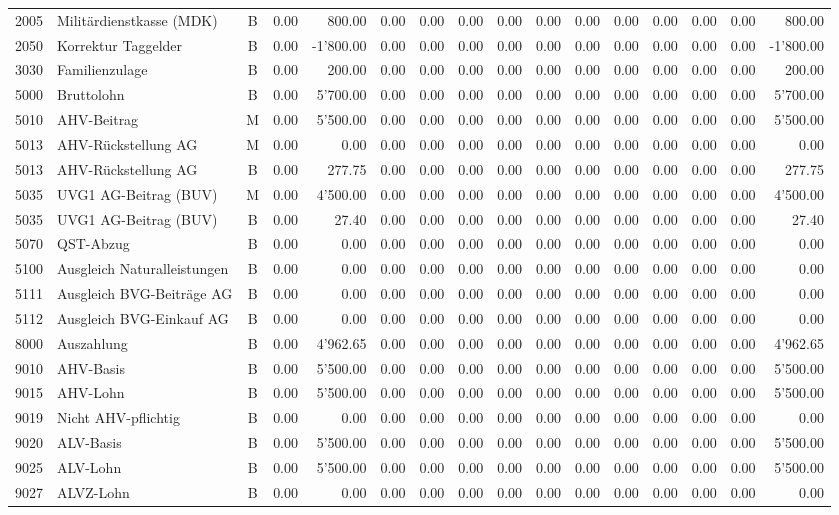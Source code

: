 \documentclass[8pt,a4paper]{extarticle}
\begin{document}
\begin{longtable}{@{\extracolsep{\fill}} l l c r r r r r r r r r r r r r}
2005&Militärdienstkasse (MDK)&B&0.00&800.00&0.00&0.00&0.00&0.00&0.00&0.00&0.00&0.00&0.00&0.00&800.00\\
2050&Korrektur Taggelder&B&0.00&-1'800.00&0.00&0.00&0.00&0.00&0.00&0.00&0.00&0.00&0.00&0.00&-1'800.00\\
3030&Familienzulage&B&0.00&200.00&0.00&0.00&0.00&0.00&0.00&0.00&0.00&0.00&0.00&0.00&200.00\\
5000&Bruttolohn&B&0.00&5'700.00&0.00&0.00&0.00&0.00&0.00&0.00&0.00&0.00&0.00&0.00&5'700.00\\
5010&AHV-Beitrag&M&0.00&5'500.00&0.00&0.00&0.00&0.00&0.00&0.00&0.00&0.00&0.00&0.00&5'500.00\\
5013&AHV-Rückstellung AG&M&0.00&0.00&0.00&0.00&0.00&0.00&0.00&0.00&0.00&0.00&0.00&0.00&0.00\\
5013&AHV-Rückstellung AG&B&0.00&277.75&0.00&0.00&0.00&0.00&0.00&0.00&0.00&0.00&0.00&0.00&277.75\\
5035&UVG1 AG-Beitrag (BUV)&M&0.00&4'500.00&0.00&0.00&0.00&0.00&0.00&0.00&0.00&0.00&0.00&0.00&4'500.00\\
5035&UVG1 AG-Beitrag (BUV)&B&0.00&27.40&0.00&0.00&0.00&0.00&0.00&0.00&0.00&0.00&0.00&0.00&27.40\\
5070&QST-Abzug&B&0.00&0.00&0.00&0.00&0.00&0.00&0.00&0.00&0.00&0.00&0.00&0.00&0.00\\
5100&Ausgleich Naturalleistungen&B&0.00&0.00&0.00&0.00&0.00&0.00&0.00&0.00&0.00&0.00&0.00&0.00&0.00\\
5111&Ausgleich BVG-Beiträge AG&B&0.00&0.00&0.00&0.00&0.00&0.00&0.00&0.00&0.00&0.00&0.00&0.00&0.00\\
5112&Ausgleich BVG-Einkauf AG&B&0.00&0.00&0.00&0.00&0.00&0.00&0.00&0.00&0.00&0.00&0.00&0.00&0.00\\
8000&Auszahlung&B&0.00&4'962.65&0.00&0.00&0.00&0.00&0.00&0.00&0.00&0.00&0.00&0.00&4'962.65\\
9010&AHV-Basis&B&0.00&5'500.00&0.00&0.00&0.00&0.00&0.00&0.00&0.00&0.00&0.00&0.00&5'500.00\\
9015&AHV-Lohn&B&0.00&5'500.00&0.00&0.00&0.00&0.00&0.00&0.00&0.00&0.00&0.00&0.00&5'500.00\\
9019&Nicht AHV-pflichtig&B&0.00&0.00&0.00&0.00&0.00&0.00&0.00&0.00&0.00&0.00&0.00&0.00&0.00\\
9020&ALV-Basis&B&0.00&5'500.00&0.00&0.00&0.00&0.00&0.00&0.00&0.00&0.00&0.00&0.00&5'500.00\\
9025&ALV-Lohn&B&0.00&5'500.00&0.00&0.00&0.00&0.00&0.00&0.00&0.00&0.00&0.00&0.00&5'500.00\\
9027&ALVZ-Lohn&B&0.00&0.00&0.00&0.00&0.00&0.00&0.00&0.00&0.00&0.00&0.00&0.00&0.00\\

\end{longtable}
\end{document}

